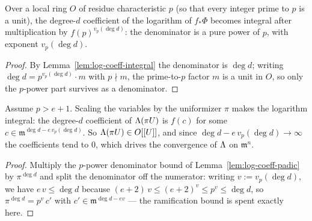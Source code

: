 \begin{lemma}
\label{lem:log-coeff-padic}
\leanok
{}
Over a local ring $O$ of residue characteristic $p$ (so that every integer prime to $p$
is a unit), the degree-$d$ coefficient of the logarithm of $f_*\Phi$ becomes integral
after multiplication by $f(p)^{v_p(\deg d)}$: the denominator is a pure power of $p$,
with exponent $v_p(\deg d)$.
\end{lemma}
\begin{proof}
\leanok
By Lemma~\ref{lem:log-coeff-integral} the denominator is $\deg d$; writing
$\deg d = p^{v_p(\deg d)}\cdot m$ with $p \nmid m$, the prime-to-$p$ factor $m$ is a
unit in $O$, so only the $p$-power part survives as a denominator.
\end{proof}

\begin{lemma}
\label{lem:log-scale-integral}
\leanok
{}
Assume $p > e + 1$. Scaling the variables by the uniformizer $\pi$ makes the logarithm
integral: the degree-$d$ coefficient of $\Lambda(\pi U)$ is $f(c)$ for some
$c \in \mathfrak m^{\deg d - e\,v_p(\deg d)}$. So $\Lambda(\pi U) \in O[[U]]$, and since
$\deg d - e\,v_p(\deg d) \to \infty$ the coefficients tend to $0$, which drives the
convergence of $\Lambda$ on $\mathfrak m^n$.
\end{lemma}
\begin{proof}
\leanok
Multiply the $p$-power denominator bound of Lemma~\ref{lem:log-coeff-padic} by
$\pi^{\deg d}$ and split the denominator off the numerator: writing $v := v_p(\deg d)$, we
have $e\,v \le \deg d$ because $(e+2)\,v \le (e+2)^v \le p^v \le \deg d$, so
$\pi^{\deg d} = p^{v}\,c'$ with $c' \in \mathfrak m^{\deg d - e v}$ --- the ramification
bound is spent exactly here.
\end{proof}

